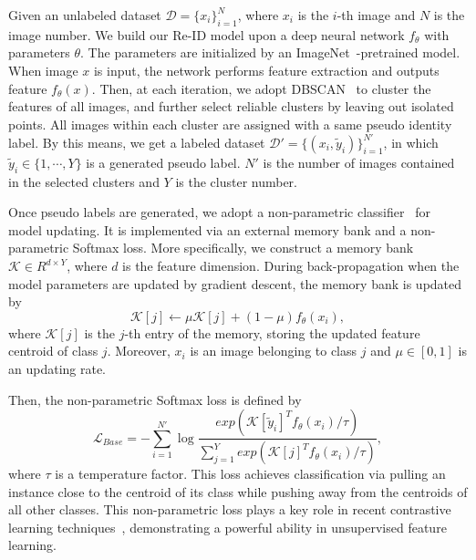 \documentclass[letterpaper]{article} %
\begin{document}
Given an unlabeled dataset $\mathcal{D} = \{x_i\}_{i=1}^{N}$, where $x_i$ is the $i$-th image and $N$ is the image number. We build our Re-ID model upon a deep neural network $f_\theta$ with parameters $\theta$. The parameters are initialized by an ImageNet~\cite{krizhevsky2012imagenet}-pretrained model. When image $x$ is input, the network performs feature extraction and outputs feature $f_\theta(x)$. Then, at each iteration, we adopt DBSCAN~\cite{ester1996density} to cluster the features of all images, and further select reliable clusters by leaving out isolated points. All images within each cluster are assigned with a same pseudo identity label. By this means, we get a labeled dataset $\mathcal{D}' = \{(x_i, \tilde{y}_i)\}_{i=1}^{N'}$, in which $\tilde{y}_i \in \{1, \cdots, Y\}$ is a generated pseudo label. $N'$ is the number of images contained in the selected clusters and $Y$ is the cluster number. %


Once pseudo labels are generated, we adopt a non-parametric classifier~\cite{wu2018memory} for model updating. It is implemented via an external memory bank and a non-parametric Softmax loss. More specifically, we construct a memory bank $\mathcal{K}\in R^{d \times Y}$, where $d$ is the feature dimension. During back-propagation when the model parameters are updated by gradient descent, the memory bank is updated by
\begin{equation}
	\mathcal{K}[j] \leftarrow \mu \mathcal{K}[j] + (1 - \mu) f_\theta(x_i),
	\label{eq:mu}
\end{equation}
where $\mathcal{K}[j]$ is the $j$-th entry of the memory, storing the updated feature centroid of class $j$. Moreover, $x_i$ is an image belonging to class $j$ and $\mu \in [0,1]$ is an updating rate. 

Then, the non-parametric Softmax loss is defined by 
\begin{equation}
\mathcal{L}_{Base} = - \sum_{i=1}^{N'} \log \frac{exp(\mathcal{K}[\tilde{y}_i]^T f_\theta(x_i)/\tau)}{\sum_{j=1}^{Y} exp(\mathcal{K}[j]^T f_\theta(x_i)/\tau)},
\label{eq_base_loss}
\end{equation}
where $\tau$ is a temperature factor. This loss achieves classification via pulling an instance close to the centroid of its class while pushing away from the centroids of all other classes. This non-parametric loss plays a key role in recent contrastive learning techniques~\cite{wu2018memory,zhong2019invariance,Chen2020SimCLR,he2019momentum}, demonstrating a powerful ability in unsupervised feature learning.
\end{document}

